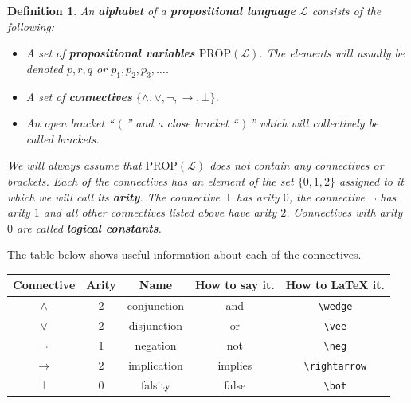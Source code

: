 \documentclass[11pt]{article}
\newcommand{\PROP}{\mathrm{PROP}}
\newtheorem{definition}[theorem]{Definition}
\newcommand{\mcal}[1]{\mathcal{#1}}
\begin{document}
\begin{definition}
An \textbf{alphabet} of a \textbf{propositional language} $\mcal{L}$ consists of the following:
\begin{itemize}
\item A set of \textbf{propositional variables} $\PROP(\mcal{L})$. The elements will usually be denoted $p,r,q$ or $p_1,p_2,p_3,\ldots$.
\item A set of \textbf{connectives} $\{\wedge, \vee, \neg, \rightarrow, \bot\}$.
\item An open bracket `` $($ '' and a close bracket `` $)$ '' which will collectively be called brackets.
\end{itemize}
We will always assume that $\PROP(\mcal{L})$ does not contain any connectives or brackets. Each of the connectives has an element of the set $\{0,1,2\}$ assigned to it which we will call its \textbf{arity}. The connective $\bot$ has arity $0$, the connective $\neg$ has arity $1$ and all other connectives listed above have arity $2$. Connectives with arity $0$ are called \textbf{logical constants}.
\end{definition}


The table below shows useful information about each of the connectives.

\bigskip

\begin{tabular}{|c|c|c|c|c|}
  \hline
  Connective & Arity & Name & How to say it. & How to LaTeX it. \\ \hline
  $\wedge$ & $2$ & conjunction & and & \verb|\wedge| \\
  $\vee$ & $2$ & disjunction & or &\verb|\vee|\\
  $\neg$ & $1$ & negation & not & \verb|\neg|\\
  $\rightarrow$ & $2$ & implication & implies &\verb|\rightarrow| \\
  $\bot$ & $0$ & falsity   & false & \verb|\bot| \\
  \hline
\end{tabular}

%
\end{document}
